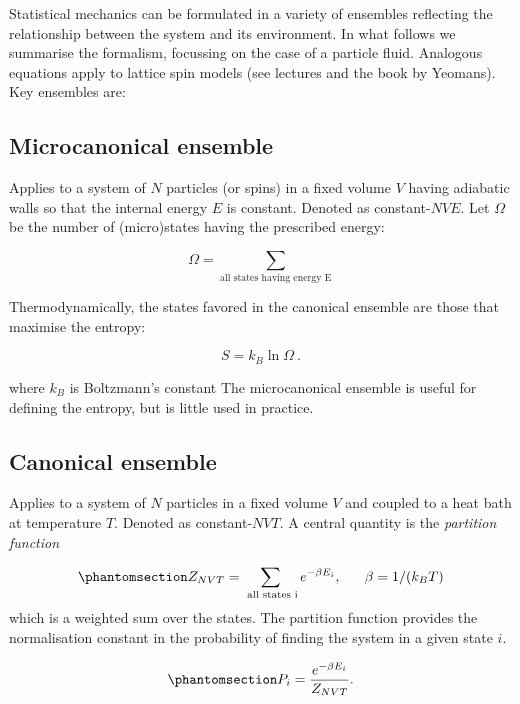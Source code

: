 \documentclass[
  letterpaper,
  enabledeprecatedfontcommands]{report}
\begin{document}

Statistical mechanics can be formulated in a variety of ensembles
reflecting the relationship between the system and its environment. In
what follows we summarise the formalism, focussing on the case of a
particle fluid. Analogous equations apply to lattice spin models (see
lectures and the book by Yeomans). Key ensembles are:

\subsection*{Microcanonical ensemble}\label{microcanonical-ensemble}

Applies to a system of \(N\) particles (or spins) in a fixed volume
\(V\) having adiabatic walls so that the internal energy \(E\) is
constant. Denoted as constant-\(NVE\). Let \(\Omega\) be the number of
(micro)states having the prescribed energy:

\[
\Omega=\sum_\textrm{all states having energy E}
\]

Thermodynamically, the states favored in the canonical ensemble are
those that maximise the entropy:

\[
S=k_B\ln \Omega\: .
\]

where \(k_B\) is Boltzmann's constant The microcanonical ensemble is
useful for defining the entropy, but is little used in practice.

\subsection*{Canonical ensemble}\label{sec-canonical}

Applies to a system of \(N\) particles in a fixed volume \(V\) and
coupled to a heat bath at temperature \(T\). Denoted as
constant-\(NVT\). A central quantity is the \emph{partition function}

\begin{equation}\phantomsection\label{eq-ZNVT}{
Z_{NVT}=\sum_\textrm{ all states i}e^{-\beta E_i},~~~~~\beta=1/(k_BT)
}\end{equation} which is a weighted sum over the states. The partition
function provides the normalisation constant in the probability of
finding the system in a given state \(i\).

\begin{equation}\phantomsection\label{eq-Pi}{
P_i=\frac{e^{-\beta E_i}}{Z_{NVT}}.
}\end{equation}
\end{document}
